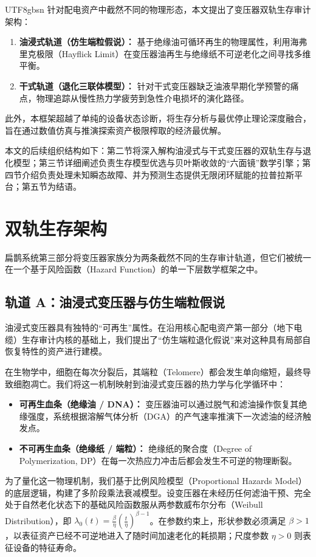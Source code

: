 \documentclass[journal]{IEEEtran}
\begin{document}
\begin{CJK*}{UTF8}{gbsn}
针对配电资产中截然不同的物理形态，本文提出了变压器双轨生存审计架构：
\begin{enumerate}
    \item \textbf{油浸式轨道（仿生端粒假说）：} 基于绝缘油可循环再生的物理属性，利用海弗里克极限（Hayflick Limit）\cite{TODO_CITE_HAYFLICK}在变压器油再生与绝缘纸不可逆老化之间寻找多维平衡。
    \item \textbf{干式轨道（退化三联体模型）：} 针对干式变压器缺乏油液早期化学预警的痛点，物理追踪从慢性热力学疲劳到急性介电损坏的演化路径。
\end{enumerate}
此外，本框架超越了单纯的设备状态诊断，将生存分析与最优停止理论深度融合，旨在通过数值仿真与推演探索资产极限榨取的经济最优解。

本文的后续组织结构如下：第二节将深入解构油浸式与干式变压器的双轨生存与退化模型；第三节详细阐述负责生存模型优选与贝叶斯收敛的“六面镜”数学引擎；第四节介绍负责处理未知瞬态故障、并为预测生态提供无限闭环赋能的拉普拉斯平台；第五节为结语。

\section{双轨生存架构}
扁鹊系统第三部分\cite{zeng2026cable,zeng2026switchgear}将变压器家族分为两条截然不同的生存审计轨道，但它们被统一在一个基于风险函数（Hazard Function）的单一下层数学框架之中。

\subsection{轨道 A：油浸式变压器与仿生端粒假说}
油浸式变压器具有独特的“可再生”属性。在沿用核心配电资产第一部分（地下电缆）生存审计内核\cite{zeng2026cable}的基础上，我们提出了“仿生端粒退化假说”来对这种具有局部自恢复特性的资产进行建模。

在生物学中，细胞在每次分裂后，其端粒（Telomere）都会发生单向缩短，最终导致细胞凋亡\cite{TODO_CITE_HAYFLICK}。我们将这一机制映射到油浸式变压器的热力学与化学循环中：
\begin{itemize}
    \item \textbf{可再生血条（绝缘油 / DNA）：} 变压器油可以通过脱气和滤油操作恢复其绝缘强度，系统根据溶解气体分析（DGA）的产气速率推演下一次滤油的经济触发点。
    \item \textbf{不可再生血条（绝缘纸 / 端粒）：} 绝缘纸的聚合度（Degree of Polymerization, DP）在每一次热应力冲击后都会发生不可逆的物理断裂。
\end{itemize}

为了量化这一物理机制，我们基于比例风险模型（Proportional Hazards Model）的底层逻辑，构建了多阶段乘法衰减模型。设变压器在未经历任何滤油干预、完全处于自然老化状态下的基础风险函数服从两参数威布尔分布（Weibull Distribution）\cite{TODO_CITE_WEIBULL}，即 $\lambda_0(t) = \frac{\beta}{\eta}\left(\frac{t}{\eta}\right)^{\beta-1}$。在参数约束上，形状参数必须满足 $\beta > 1$，以表征资产已经不可逆地进入了随时间加速老化的耗损期；尺度参数 $\eta > 0$ 则表征设备的特征寿命。


\end{CJK*}
\end{document}
